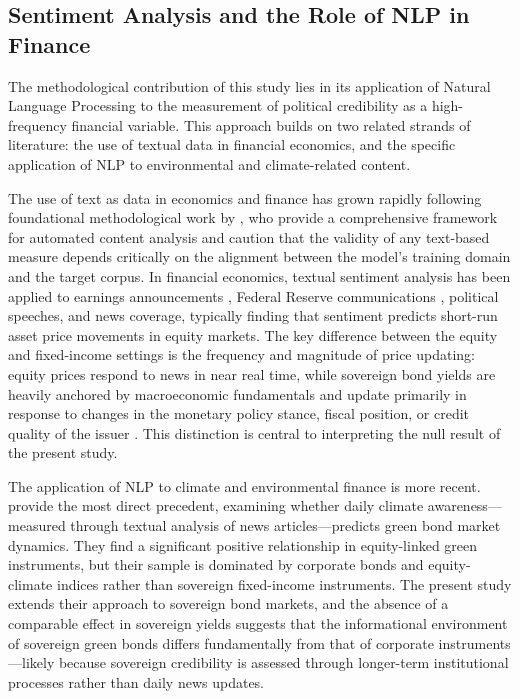 \documentclass[12pt,a4paper]{article}
\begin{document}
\subsection{Sentiment Analysis and the Role of NLP in Finance}

The methodological contribution of this study lies in its application of Natural Language Processing to the measurement of political credibility as a high-frequency financial variable. This approach builds on two related strands of literature: the use of textual data in financial economics, and the specific application of NLP to environmental and climate-related content.

The use of text as data in economics and finance has grown rapidly following foundational methodological work by \citet{Grimmer2013}, who provide a comprehensive framework for automated content analysis and caution that the validity of any text-based measure depends critically on the alignment between the model's training domain and the target corpus. In financial economics, textual sentiment analysis has been applied to earnings announcements \citep{Tetlock2007}, Federal Reserve communications \citep{Gürkaynak2005}, political speeches, and news coverage, typically finding that sentiment predicts short-run asset price movements in equity markets. The key difference between the equity and fixed-income settings is the frequency and magnitude of price updating: equity prices respond to news in near real time, while sovereign bond yields are heavily anchored by macroeconomic fundamentals and update primarily in response to changes in the monetary policy stance, fiscal position, or credit quality of the issuer \citep{Gürkaynak2005}. This distinction is central to interpreting the null result of the present study.

The application of NLP to climate and environmental finance is more recent. \citet{Dragotto2025} provide the most direct precedent, examining whether daily climate awareness---measured through textual analysis of news articles---predicts green bond market dynamics. They find a significant positive relationship in equity-linked green instruments, but their sample is dominated by corporate bonds and equity-climate indices rather than sovereign fixed-income instruments. The present study extends their approach to sovereign bond markets, and the absence of a comparable effect in sovereign yields suggests that the informational environment of sovereign green bonds differs fundamentally from that of corporate instruments---likely because sovereign credibility is assessed through longer-term institutional processes rather than daily news updates.
\end{document}
